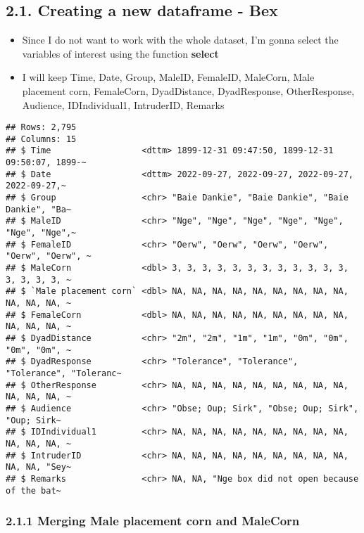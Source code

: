 \documentclass[
]{article}
\begin{document}
\hypertarget{creating-a-new-dataframe---bex}{%
\subsection{2.1. Creating a new dataframe -
Bex}\label{creating-a-new-dataframe---bex}}

\begin{itemize}
\item
  Since I do not want to work with the whole dataset, I'm gonna select
  the variables of interest using the function \textbf{select}
\item
  I will keep Time, Date, Group, MaleID, FemaleID, MaleCorn, Male
  placement corn, FemaleCorn, DyadDistance, DyadResponse, OtherResponse,
  Audience, IDIndividual1, IntruderID, Remarks
\end{itemize}

\begin{verbatim}
## Rows: 2,795
## Columns: 15
## $ Time                  <dttm> 1899-12-31 09:47:50, 1899-12-31 09:50:07, 1899-~
## $ Date                  <dttm> 2022-09-27, 2022-09-27, 2022-09-27, 2022-09-27,~
## $ Group                 <chr> "Baie Dankie", "Baie Dankie", "Baie Dankie", "Ba~
## $ MaleID                <chr> "Nge", "Nge", "Nge", "Nge", "Nge", "Nge", "Nge",~
## $ FemaleID              <chr> "Oerw", "Oerw", "Oerw", "Oerw", "Oerw", "Oerw", ~
## $ MaleCorn              <dbl> 3, 3, 3, 3, 3, 3, 3, 3, 3, 3, 3, 3, 3, 3, 3, 3, ~
## $ `Male placement corn` <dbl> NA, NA, NA, NA, NA, NA, NA, NA, NA, NA, NA, NA, ~
## $ FemaleCorn            <dbl> NA, NA, NA, NA, NA, NA, NA, NA, NA, NA, NA, NA, ~
## $ DyadDistance          <chr> "2m", "2m", "1m", "1m", "0m", "0m", "0m", "0m", ~
## $ DyadResponse          <chr> "Tolerance", "Tolerance", "Tolerance", "Toleranc~
## $ OtherResponse         <chr> NA, NA, NA, NA, NA, NA, NA, NA, NA, NA, NA, NA, ~
## $ Audience              <chr> "Obse; Oup; Sirk", "Obse; Oup; Sirk", "Oup; Sirk~
## $ IDIndividual1         <chr> NA, NA, NA, NA, NA, NA, NA, NA, NA, NA, NA, NA, ~
## $ IntruderID            <chr> NA, NA, NA, NA, NA, NA, NA, NA, NA, NA, NA, "Sey~
## $ Remarks               <chr> NA, NA, "Nge box did not open because of the bat~
\end{verbatim}

\hypertarget{merging-male-placement-corn-and-malecorn}{%
\subsubsection{2.1.1 Merging Male placement corn and
MaleCorn}\label{merging-male-placement-corn-and-malecorn}}
\end{document}

